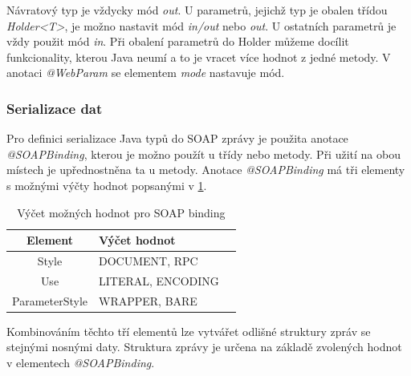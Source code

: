 \documentclass[11pt,twoside,a4paper]{book}
\begin{document}
Návratový typ je vždycky mód {\em out}. U parametrů, jejichž typ je obalen
třídou {\em Holder<T>}, je možno nastavit mód {\em in/out} nebo {\em out}. U
ostatních parametrů je vždy použit mód {\em in}. Při obalení parametrů do Holder
můžeme docílit funkcionality, kterou Java neumí a to je vracet více hodnot z
jedné metody. V anotaci {\em @WebParam} se elementem {\em mode} nastavuje mód.

\subsubsection{Serializace dat}
\label{subsec:serializace-dat}

Pro definici serializace Java typů do SOAP zprávy je použita anotace {\em @SOAPBinding}, kterou
je možno použít u třídy nebo metody.
Při užití na obou místech je upřednostněna ta u metody. Anotace {\em @SOAPBinding} má
tři elementy s možnými výčty hodnot popsanými v
\ref{tab:soap-binding-vycet-hodnot}.

\begin{table}[h]
\begin{center}
\begin{tabular}{|c|l|l|}
\hline
\textbf{Element} & \textbf{Výčet hodnot} \\
\hline
Style & DOCUMENT, RPC \\
\hline
Use & LITERAL, ENCODING \\
\hline
ParameterStyle & WRAPPER, BARE \\
\hline
\end{tabular}
\end{center}
\caption{Výčet možných hodnot pro SOAP binding}
\label{tab:soap-binding-vycet-hodnot}
\end{table}

Kombinováním těchto tří elementů lze vytvářet odlišné struktury zpráv se stejnými nosnými
daty. Struktura zprávy je určena na základě zvolených hodnot v elementech {\em @SOAPBinding}.
\end{document}
